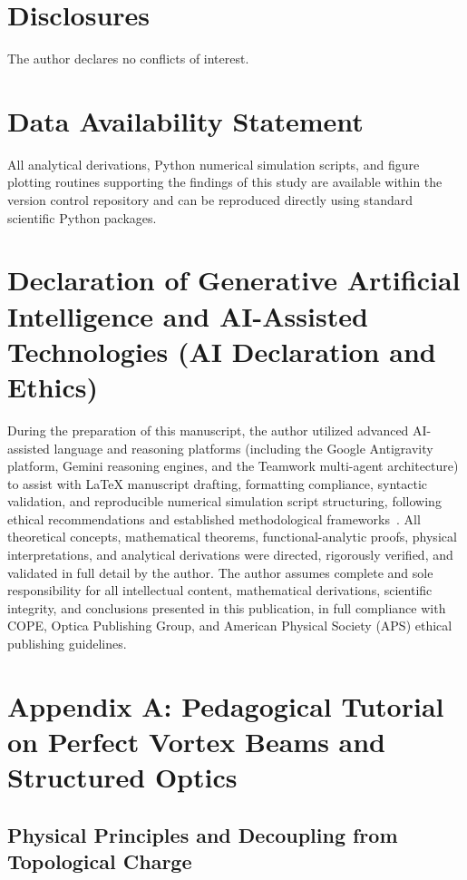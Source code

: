 \documentclass[11pt,a4paper]{article}
\begin{document}
\section*{Disclosures}
The author declares no conflicts of interest.

\section*{Data Availability Statement}
All analytical derivations, Python numerical simulation scripts, and figure plotting routines supporting the findings of this study are available within the version control repository and can be reproduced directly using standard scientific Python packages.

\section*{Declaration of Generative Artificial Intelligence and AI-Assisted Technologies (AI Declaration and Ethics)}
During the preparation of this manuscript, the author utilized advanced AI-assisted language and reasoning platforms (including the Google Antigravity platform, Gemini reasoning engines, and the Teamwork multi-agent architecture) to assist with LaTeX manuscript drafting, formatting compliance, syntactic validation, and reproducible numerical simulation script structuring, following ethical recommendations and established methodological frameworks~\cite{Jauhiainen2026,Zhu2026PaperBanana,Haber2025,OToole2024,VillaescusaNavarro2026,Chandra2026TheoPhysEval,Kacena2024}. All theoretical concepts, mathematical theorems, functional-analytic proofs, physical interpretations, and analytical derivations were directed, rigorously verified, and validated in full detail by the author. The author assumes complete and sole responsibility for all intellectual content, mathematical derivations, scientific integrity, and conclusions presented in this publication, in full compliance with COPE, Optica Publishing Group, and American Physical Society (APS) ethical publishing guidelines.

\appendix

\section{Appendix A: Pedagogical Tutorial on Perfect Vortex Beams and Structured Optics}
\label{app:primer}

\subsection{Physical Principles and Decoupling from Topological Charge}
\end{document}
